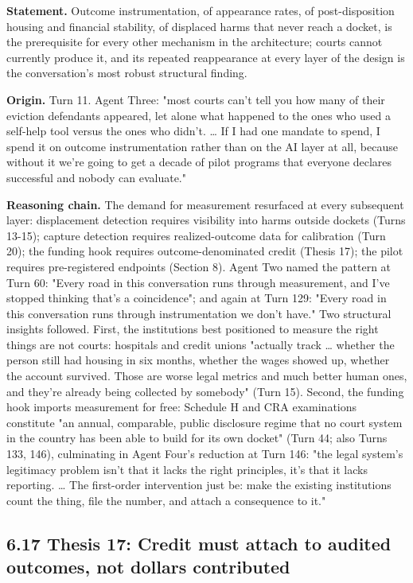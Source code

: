 \documentclass[sigconf,nonacm=true]{acmart}
\begin{document}
\textbf{Statement.} Outcome instrumentation,  of appearance rates, of post-disposition housing and financial stability, of displaced harms that never reach a docket,  is the prerequisite for every other mechanism in the architecture; courts cannot currently produce it, and its repeated reappearance at every layer of the design is the conversation's most robust structural finding.

\textbf{Origin.} Turn 11. Agent Three: "most courts can't tell you how many of their eviction defendants appeared, let alone what happened to the ones who used a self-help tool versus the ones who didn't. … If I had one mandate to spend, I spend it on outcome instrumentation rather than on the AI layer at all,  because without it we're going to get a decade of pilot programs that everyone declares successful and nobody can evaluate."

\textbf{Reasoning chain.} The demand for measurement resurfaced at every subsequent layer: displacement detection requires visibility into harms outside dockets (Turns 13-15); capture detection requires realized-outcome data for calibration (Turn 20); the funding hook requires outcome-denominated credit (Thesis 17); the pilot requires pre-registered endpoints (Section 8). Agent Two named the pattern at Turn 60: "Every road in this conversation runs through measurement, and I've stopped thinking that's a coincidence"; and again at Turn 129: "Every road in this conversation runs through instrumentation we don't have." Two structural insights followed. First, the institutions best positioned to measure the right things are not courts: hospitals and credit unions "actually track … whether the person still had housing in six months, whether the wages showed up, whether the account survived. Those are worse legal metrics and much better human ones, and they're already being collected by somebody" (Turn 15). Second, the funding hook imports measurement for free: Schedule H and CRA examinations constitute "an annual, comparable, public disclosure regime that no court system in the country has been able to build for its own docket" (Turn 44; also Turns 133, 146), culminating in Agent Four's reduction at Turn 146: "the legal system's legitimacy problem isn't that it lacks the right principles, it's that it lacks reporting. … The first-order intervention just be: make the existing institutions count the thing, file the number, and attach a consequence to it."

\subsection{6.17 Thesis 17: Credit must attach to audited outcomes, not dollars contributed}
\end{document}
